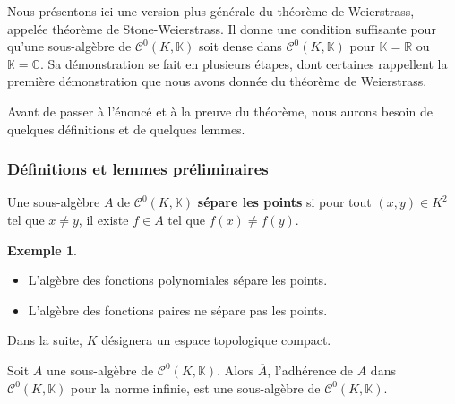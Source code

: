 \documentclass[french]{article}
\newcommand{\R}{\mathbb{R}}
\newcommand{\C}{\mathbb{C}}
\newcommand{\K}{\mathbb{K}}
\theoremstyle{plain}
\theoremstyle{definition}
\newtheorem*{ex}{Exemple}
\theoremstyle{remark}
\begin{document}
Nous présentons ici une version plus générale du théorème de Weierstrass, appelée théorème de Stone-Weierstrass. Il donne une condition suffisante pour qu'une sous-algèbre de $\mathcal{C}^0(K,\K)$ soit dense dans $\mathcal{C}^0(K,\K)$ pour $\K=\R$ ou $\K=\C$. Sa démonstration se fait en plusieurs étapes, dont certaines rappellent la première démonstration que nous avons donnée du théorème de Weierstrass.

Avant de passer à l'énoncé et à la preuve du théorème, nous aurons besoin de quelques définitions et de quelques lemmes.

\subsubsection*{Définitions et lemmes préliminaires}

\begin{dfn}
	Une sous-algèbre $A$ de $\mathcal{C}^0(K,\K)$ \textbf{sépare les points} si pour tout $(x,y)\in K^2$ tel que $x\ne y$, il existe $f\in A$ tel que $f(x)\ne f(y)$.
\end{dfn}

\begin{ex}
	\begin{itemize}
		\item L'algèbre des fonctions polynomiales sépare les points.
		\item L'algèbre des fonctions paires ne sépare pas les points.
	\end{itemize}
\end{ex}

Dans la suite, $K$ désignera un espace topologique compact.

\begin{lem}%
	Soit $A$ une sous-algèbre de $\mathcal{C}^0(K,\K)$. Alors $\overline{A}$, l'adhérence de $A$ dans $\mathcal{C}^0(K,\K)$ pour la norme infinie, est une sous-algèbre de $\mathcal{C}^0(K,\K)$.
\end{lem}
\end{document}
